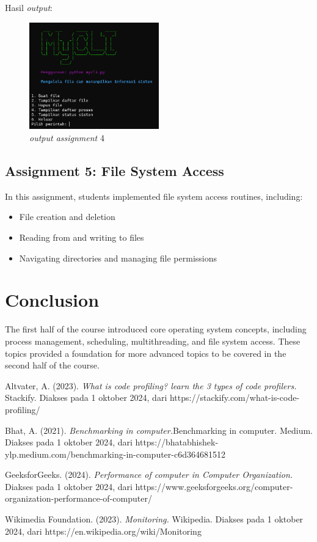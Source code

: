 \documentclass[12pt]{article}
\begin{document}
\par Hasil \textit{output}:
\begin{figure}[h]
    \centering
    \includegraphics[width=0.5\textwidth] {asset/output_assignment4_group2.png} 
    \caption{\textit{output assignment} 4}
    \label{fig:output_assignment_4}
\end{figure}

\subsection{Assignment 5: File System Access}
In this assignment, students implemented file system access routines, including:
\begin{itemize}
    \item File creation and deletion
    \item Reading from and writing to files
    \item Navigating directories and managing file permissions
\end{itemize}

\section{Conclusion}
The first half of the course introduced core operating system concepts, including process management, scheduling, multithreading, and file system access. These topics provided a foundation for more advanced topics to be covered in the second half of the course.

\begin{thebibliography}{4}
    Altvater, A. (2023). \textit{What is code profiling? learn the 3 types of code profilers.} Stackify. Diakses pada 1 oktober 2024, dari https://stackify.com/what-is-code-profiling/ 
    
    Bhat, A. (2021). \textit{Benchmarking in computer.}Benchmarking in computer. Medium. Diakses pada 1 oktober 2024, dari https://bhatabhishek-ylp.medium.com/benchmarking-in-computer-c6d364681512 

    GeeksforGeeks. (2024). \textit{Performance of computer in Computer Organization.} Diakses pada 1 oktober 2024, dari https://www.geeksforgeeks.org/computer-organization-performance-of-computer/ 

    Wikimedia Foundation. (2023). \textit{Monitoring.} Wikipedia. Diakses pada 1 oktober 2024, dari https://en.wikipedia.org/wiki/Monitoring 
\end{thebibliography}
\end{document}
